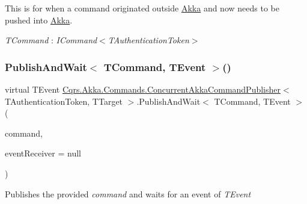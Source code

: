 This is for when a command originated outside \hyperlink{namespaceCqrs_1_1Akka}{Akka} and now needs to be pushed into \hyperlink{namespaceCqrs_1_1Akka}{Akka}. \begin{Desc}
\item[Type Constraints]\begin{description}
\item[{\em T\+Command} : {\em I\+Command$<$T\+Authentication\+Token$>$}]\end{description}
\end{Desc}
\mbox{\label{classCqrs_1_1Akka_1_1Commands_1_1ConcurrentAkkaCommandPublisher_ad88c8edbc1e145807a400a246cb6531b_ad88c8edbc1e145807a400a246cb6531b}} 
\subsubsection{\texorpdfstring{Publish\+And\+Wait$<$ T\+Command, T\+Event $>$()}{PublishAndWait< TCommand, TEvent >()}\hspace{0.1cm}{\footnotesize\ttfamily [1/6]}}
{\footnotesize\ttfamily virtual T\+Event \hyperlink{classCqrs_1_1Akka_1_1Commands_1_1ConcurrentAkkaCommandPublisher}{Cqrs.\+Akka.\+Commands.\+Concurrent\+Akka\+Command\+Publisher}$<$ T\+Authentication\+Token, T\+Target $>$.Publish\+And\+Wait$<$ T\+Command, T\+Event $>$ (\begin{DoxyParamCaption}\item[{T\+Command}]{command,  }\item[{\hyperlink{interfaceCqrs_1_1Events_1_1IEventReceiver}{I\+Event\+Receiver}$<$ T\+Authentication\+Token $>$}]{event\+Receiver = {\ttfamily null} }\end{DoxyParamCaption})\hspace{0.3cm}{\ttfamily [virtual]}}



Publishes the provided {\itshape command}  and waits for an event of {\itshape T\+Event}  


